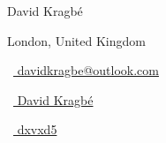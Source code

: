\begin{Large} 
	David Kragbé
\end{Large}

\vspace*{0.25em}

\begin{footnotesize}
	\begin{tiny}\faLocationArrow\end{tiny}{
		 London, United Kingdom
	}
	\quad \begin{tiny}\faEnvelope[regular]\end{tiny}~\href{mailto:davidkragbe@outlook.com}{%
		davidkragbe@outlook.com
	} 
	\quad 
	\quad 
	\begin{tiny}\faLinkedinIn\end{tiny}~\href{https://www.linkedin.com/in/david-kragb%C3%A9-791199165}{
		David Kragbé
	}
	\quad 
	\begin{tiny}\faGithub\end{tiny}~\href{https://github.com/dxvxd5}{
		 dxvxd5
		}
\end{footnotesize}